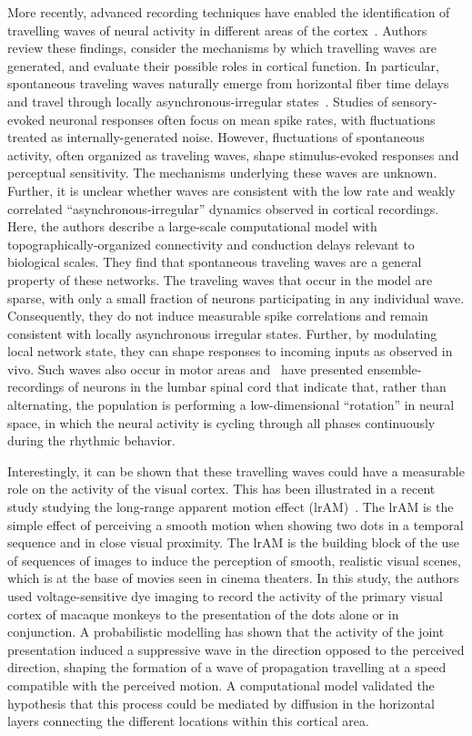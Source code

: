 \documentclass[brainsci, %
               review,submit,pdftex,moreauthors%
               ]{Definitions/mdpi}
\begin{document}
More recently, advanced recording techniques have enabled the identification of travelling waves of neural activity in different areas of the cortex~\citep{muller_cortical_2018}. Authors review these findings, consider the mechanisms by which travelling waves are generated, and evaluate their possible roles in cortical function. In particular, spontaneous traveling waves naturally emerge from horizontal fiber time delays and travel through locally asynchronous-irregular states~\citep{davis_spontaneous_2021}. Studies of sensory-evoked neuronal responses often focus on mean spike rates, with fluctuations treated as internally-generated noise. However, fluctuations of spontaneous activity, often organized as traveling waves, shape stimulus-evoked responses and perceptual sensitivity. The mechanisms underlying these waves are unknown. Further, it is unclear whether waves are consistent with the low rate and weakly correlated ``asynchronous-irregular'' dynamics observed in cortical recordings. Here, the authors describe a large-scale computational model with topographically-organized connectivity and conduction delays relevant to biological scales. They find that spontaneous traveling waves are a general property of these networks. The traveling waves that occur in the model are sparse, with only a small fraction of neurons participating in any individual wave. Consequently, they do not induce measurable spike correlations and remain consistent with locally asynchronous irregular states. Further, by modulating local network state, they can shape responses to incoming inputs as observed in vivo. Such waves also occur in motor areas and~\citep{linden_movement_2021} have presented ensemble-recordings of neurons in the lumbar spinal cord that indicate that, rather than alternating, the population is performing a low-dimensional ``rotation'' in neural space, in which the neural activity is cycling through all phases continuously during the rhythmic behavior.

Interestingly, it can be shown that these travelling waves could have a measurable role on the activity of the visual cortex. This has been illustrated in a recent study studying the long-range apparent motion effect (lrAM)~\citep{chemla_suppressive_2019}. The lrAM is the simple effect of perceiving a smooth motion when showing two dots in a temporal sequence and in close visual proximity. The lrAM is the building block of the use of sequences of images to induce the perception of smooth, realistic visual scenes, which is at the base of movies seen in cinema theaters. In this study, the authors used voltage-sensitive dye imaging to record the activity of the primary visual cortex of macaque monkeys to the presentation of the dots alone or in conjunction. A probabilistic modelling has shown that the activity of the joint presentation induced a suppressive wave in the direction opposed to the perceived direction, shaping the formation of a wave of propagation travelling at a speed compatible with the perceived motion. A computational model validated the hypothesis that this process could be mediated by diffusion in the horizontal layers connecting the different locations within this cortical area.
%
\end{document}
